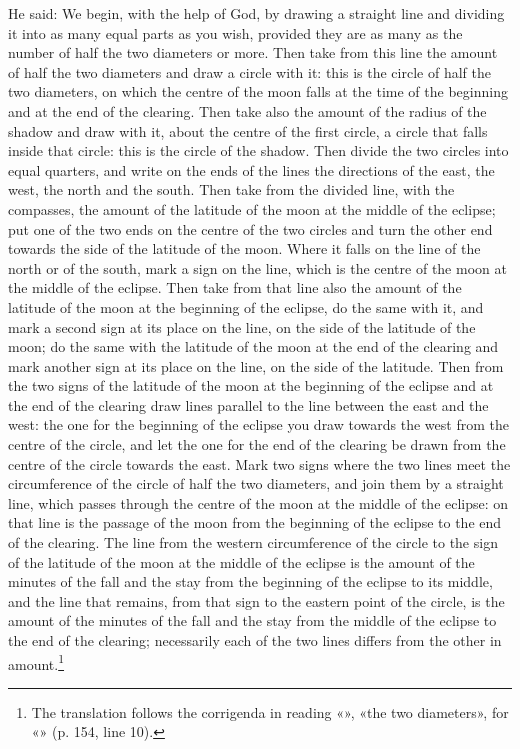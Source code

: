 \documentclass[11pt]{article}
\newcommand{\ArPage}[1]{\marginpar{\footnotesize\color{gray}Ar.\,p.\,#1}}
\begin{document}
\par \ArPage{155}He said: We begin, with the help of God, by drawing a straight line and dividing it into as many equal parts as you wish, provided they are as many as the number of half the two diameters or more. Then take from this line the amount of half the two diameters and draw a circle with it: this is the circle of half the two diameters, on which the centre of the moon falls at the time of the beginning and at the end of the clearing. Then take also the amount of the radius of the shadow and draw with it, about the centre of the first circle, a circle that falls inside that circle: this is the circle of the shadow. Then divide the two circles into equal quarters, and write on the ends of the lines the directions of the east, the west, the north and the south. Then take from the divided line, with the compasses, the amount of the latitude of the moon at the middle of the eclipse; put one of the two ends on the centre of the two circles and turn the other end towards the side of the latitude of the moon. Where it falls on the line of the north or of the south, mark a sign on the line, which is the centre of the moon at the middle of the eclipse. Then take from that line also the amount of the latitude of the moon at the beginning of the eclipse, do the same with it, and mark a second sign at its place on the line, on the side of the latitude of the moon; do the same with the latitude of the moon at the end of the clearing and mark another sign at its place on the line, on the side of the latitude. Then from the two signs of the latitude of the moon at the beginning of the eclipse and at the end of the clearing draw lines parallel to the line between the east and the west: the one for the beginning of the eclipse you draw towards the west from the centre of the circle, and let the one for the end of the clearing be drawn from the centre of the circle towards the east. Mark two signs where the two lines meet the circumference of the circle of half the two diameters, and join them by a straight line, which passes through the centre of the moon at the middle of the eclipse: on that line is the passage of the moon from the beginning of the eclipse to the end of the clearing. The line from the western circumference of the circle to the sign of the latitude of the moon at the middle of the eclipse is the amount of the minutes of the fall and the stay from the beginning of the eclipse to its middle, and the line that remains, from that sign to the eastern point of the circle, is the amount of the minutes of the fall and the stay from the middle of the eclipse to the end of the clearing; necessarily each of the two lines differs from the other in amount.\footnote{The translation follows the corrigenda in reading «», «the two diameters», for «» (p. 154, line 10).}\par
\end{document}

